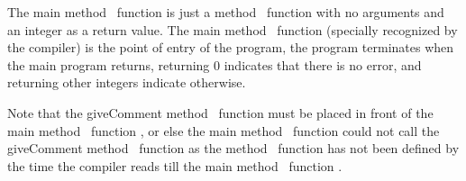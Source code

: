 The main\if{} method \else ~function \fi is just a\if{} method \else ~function \fi with no arguments and an integer as a return value. The main\if{} method \else ~function \fi (specially recognized by the compiler) is the point of entry of the program, the program terminates when the main program returns, returning 0 indicates that there is no error, and returning other integers indicate otherwise.
\vspace{6mm}

Note that the giveComment\if{} method \else ~function \fi must be placed in front of the main\if{} method \else ~function \fi, or else the main\if{} method \else ~function \fi could not call the giveComment\if{} method \else ~function \fi as the\if{} method \else ~function \fi has not been defined by the time the compiler reads till the main\if{} method \else ~function \fi. 

